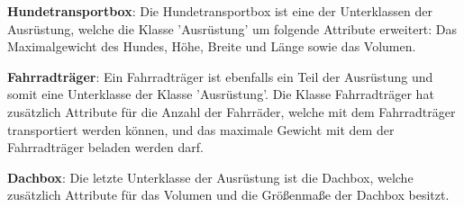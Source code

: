 \textbf{Hundetransportbox}: Die Hundetransportbox ist eine der Unterklassen der Ausrüstung, welche die Klasse 'Ausrüstung' um folgende Attribute erweitert: Das Maximalgewicht des Hundes, Höhe, Breite und Länge sowie das Volumen.

\textbf{Fahrradträger}: Ein Fahrradträger ist ebenfalls ein Teil der Ausrüstung und somit eine Unterklasse der Klasse 'Ausrüstung'. Die Klasse Fahrradträger hat zusätzlich Attribute für die Anzahl der Fahrräder, welche mit dem Fahrradträger transportiert werden können, und das maximale Gewicht mit dem der Fahrradträger beladen werden darf.

\textbf{Dachbox}: Die letzte Unterklasse der Ausrüstung ist die Dachbox, welche zusätzlich Attribute für das Volumen und die Größenmaße der Dachbox besitzt.
